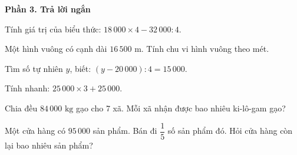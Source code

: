 \textbf{Phần 3. Trả lời ngắn}

\begin{ex} %
Tính giá trị của biểu thức: $18\,000 \times 4 - 32\,000 : 4$.
\end{ex}

\begin{ex} %
Một hình vuông có cạnh dài $16\,500\text{ m}$. Tính chu vi hình vuông theo mét.
\end{ex}

\begin{ex} %
Tìm số tự nhiên $y$, biết: $(y - 20\,000) : 4 = 15\,000$.
\end{ex}

\begin{ex} %
Tính nhanh: $25\,000 \times 3 + 25\,000$.
\end{ex}

\begin{ex} %
Chia đều $84\,000\text{ kg}$ gạo cho 7 xã. Mỗi xã nhận được bao nhiêu ki-lô-gam gạo?
\end{ex}

\begin{ex} %
Một cửa hàng có $95\,000$ sản phẩm. Bán đi $\dfrac{1}{5}$ số sản phẩm đó. Hỏi cửa hàng còn lại bao nhiêu sản phẩm?
\end{ex}

